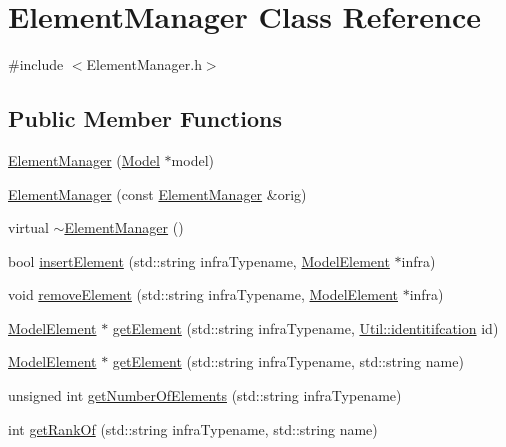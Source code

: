 \hypertarget{class_element_manager}{}\section{Element\+Manager Class Reference}
\label{class_element_manager}


{\ttfamily \#include $<$Element\+Manager.\+h$>$}

\subsection*{Public Member Functions}
\begin{DoxyCompactItemize}
\item 
\hyperlink{class_element_manager_abdf29f8c7805df664ed077481e767051}{Element\+Manager} (\hyperlink{class_model}{Model} $\ast$model)
\item 
\hyperlink{class_element_manager_a674093b8cf13e0df185b9a90e92ec2cb}{Element\+Manager} (const \hyperlink{class_element_manager}{Element\+Manager} \&orig)
\item 
virtual \hyperlink{class_element_manager_a7cd0ea7c41af215ed20657493cd96e3b}{$\sim$\+Element\+Manager} ()
\item 
bool \hyperlink{class_element_manager_ad3158696ee88632fe42e5cebb2af4582}{insert\+Element} (std\+::string infra\+Typename, \hyperlink{class_model_element}{Model\+Element} $\ast$infra)
\item 
void \hyperlink{class_element_manager_a2f918ec41d81e4ec0ba14fa6c6ab249a}{remove\+Element} (std\+::string infra\+Typename, \hyperlink{class_model_element}{Model\+Element} $\ast$infra)
\item 
\hyperlink{class_model_element}{Model\+Element} $\ast$ \hyperlink{class_element_manager_a31be666a89f2a19583ac0bf3e124cf32}{get\+Element} (std\+::string infra\+Typename, \hyperlink{class_util_ad17d458d9344b10bba64347e514d6d71}{Util\+::identitifcation} id)
\item 
\hyperlink{class_model_element}{Model\+Element} $\ast$ \hyperlink{class_element_manager_ae5f80eb977a94280705de474e49f2e04}{get\+Element} (std\+::string infra\+Typename, std\+::string name)
\item 
unsigned int \hyperlink{class_element_manager_ade38f33e0b0902ea4d4e756592c77998}{get\+Number\+Of\+Elements} (std\+::string infra\+Typename)
\item 
int \hyperlink{class_element_manager_a9d3f036b85665023061f62c19cdf0cc0}{get\+Rank\+Of} (std\+::string infra\+Typename, std\+::string name)

\end{DoxyCompactItemize}
